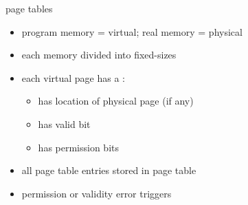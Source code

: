\begin{frame}{page tables}
    \begin{itemize}
    \item program memory = virtual; real memory = physical
    \item each memory divided into fixed-sizes 
    \item each virtual page has a :
        \begin{itemize}
        \item has location of physical page (if any)
        \item has valid bit
        \item has permission bits
        \end{itemize}
    \item all page table entries stored in page table
    \item permission or validity error triggers 
    \end{itemize}
\end{frame}

